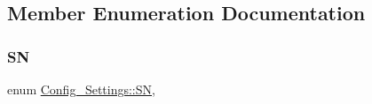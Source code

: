 \subsection{Member Enumeration Documentation}
\mbox{\label{class_config___settings_af7668729f6d56b25d126b0a9ce06474f}} 
\subsubsection{\texorpdfstring{SN}{SN}}
{\footnotesize\ttfamily enum \hyperlink{class_config___settings_af7668729f6d56b25d126b0a9ce06474f}{Config\+\_\+\+Settings\+::\+SN}\hspace{0.3cm}{\ttfamily [strong]}, {\ttfamily [private]}}


